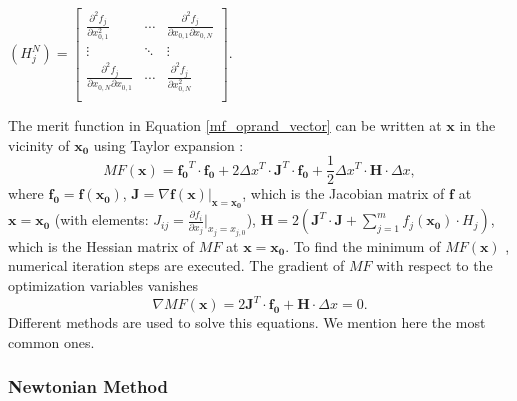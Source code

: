 \medskip
\begin{center}
$
\left( H^N_{j} \right) = 
\begin{bmatrix}
\frac{\partial^2 f_j}{\partial{x_{0,1}^2}} &    \cdots          & \frac{\partial^2 f_j}{\partial{x_{0,1}\partial{x_{0,N}}}}    \\
       \vdots                   &     \ddots            & \vdots \\
\frac{\partial^2 f_j}{\partial{x_{0,N}\partial{x_{0,1}}}}     & \cdots           & \frac{\partial^2 f_j}{\partial{x_{0,N}^2}} \\
\end{bmatrix}
$.
\end{center}
\medskip
The merit function in Equation \ref{mf_oprand_vector} can be written at $\pmb{x}$ in the vicinity of $\pmb{x_0}$ using Taylor expansion :
\begin{equation} \label{mf_expanded}
MF(\pmb{x}) = \pmb{f_{0}}^{T} \cdot \pmb{f_{0}} + 2 \Delta x^{T} \cdot \pmb{J}^{T} \cdot \pmb{f_{0}} + \frac{1}{2} \Delta x^{T} \cdot \pmb{H} \cdot \Delta x,
\end{equation}where $\pmb{f_0} = \pmb{f}(\pmb{x_0})$, $\pmb{J} = \nabla \pmb{f}(\pmb{x})\vert _{\pmb{x} = \pmb{x_0}}$, which is the Jacobian matrix of $\pmb{f}$ at $ \pmb{x} = \pmb{x_0} $ (with elements: $J_{ij} = \frac{\partial{f_i}}{\partial {x_j}} \vert _{x_j = x_{j,0}}$), $\pmb{H} = 2 \left( \pmb{J}^T \cdot \pmb{J} + \sum_{j=1}^{m} f_j(\pmb{x_0}) \cdot H_j \right) $, which is the Hessian matrix of $MF$ at $ \pmb{x} = \pmb{x_0} $. 
To find the minimum of $MF(\pmb{x})$ , numerical iteration steps are executed. The gradient of $MF$ with respect to the optimization variables vanishes
\begin{equation}\label{eq: MF_grad_zero}
\nabla MF(\pmb{x}) = 2 \pmb{J}^{T} \cdot \pmb{f_0} + \pmb{H} \cdot \Delta x = 0.
\end{equation}Different methods are used to solve this equations. We mention here the most common ones. 
\newline

\subsubsection{Newtonian Method}

